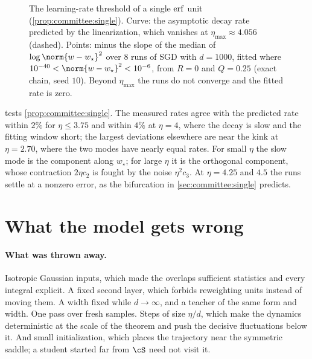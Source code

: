 \begin{refsection}
\begin{figure}[t]
\centering
{}
\caption{The learning-rate threshold of a single $\operatorname{erf}$ unit (\cref{prop:committee:single}). Curve: the asymptotic decay rate predicted by the linearization, which vanishes at $\eta_{\max}\approx4.056$ (dashed). Points: minus the slope of the median of $\log\norm{w-w_\star}^2$ over $8$ runs of SGD with $d=1000$, fitted where $10^{-40}<\norm{w-w_\star}^2<10^{-6}$, from $R=0$ and $Q=0.25$ (exact chain, seed $10$). Beyond $\eta_{\max}$ the runs do not converge and the fitted rate is zero.}\label{fig:committee:single}
\end{figure}

 tests \cref{prop:committee:single}. The measured rates agree with the predicted rate within $2\%$ for $\eta\le3.75$ and within $4\%$ at $\eta=4$, where the decay is slow and the fitting window short; the largest deviations elsewhere are near the kink at $\eta=2.70$, where the two modes have nearly equal rates. For small $\eta$ the slow mode is the component along $w_\star$; for large $\eta$ it is the orthogonal component, whose contraction $2\eta c_2$ is fought by the noise $\eta^2c_3$. At $\eta=4.25$ and $4.5$ the runs settle at a nonzero error, as the bifurcation in \cref{sec:committee:single} predicts.

\section{What the model gets wrong}\label{sec:committee:wrong}

\paragraph{What was thrown away.}
Isotropic Gaussian inputs, which made the overlaps sufficient statistics and every integral explicit. A fixed second layer, which forbids reweighting units instead of moving them. A width fixed while $d\to\infty$, and a teacher of the same form and width. One pass over fresh samples. Steps of size $\eta/d$, which make the dynamics deterministic at the scale of the theorem and push the decisive fluctuations below it. And small initialization, which places the trajectory near the symmetric saddle; a student started far from $\cS$ need not visit it.


\end{refsection}
